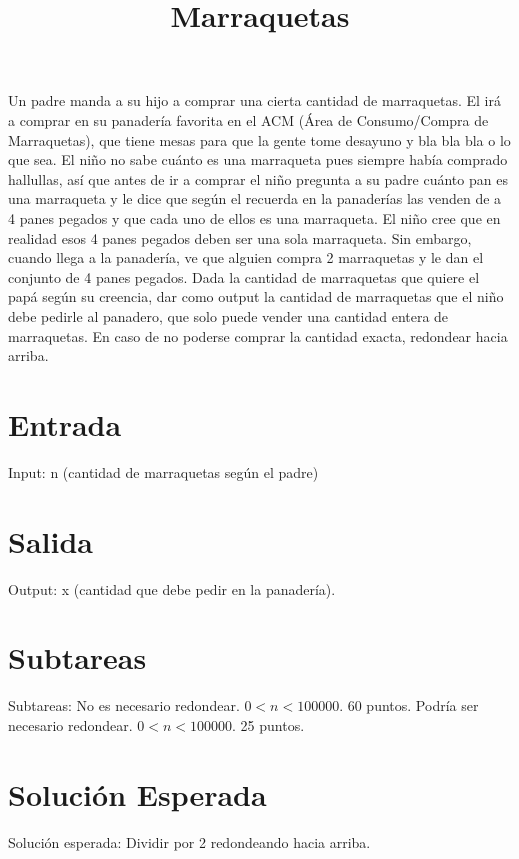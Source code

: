 \documentclass{article}
\title{Marraquetas}
\begin{document}
\maketitle

Un padre manda a su hijo a comprar una cierta cantidad de marraquetas. El irá a comprar en su panadería favorita en el ACM (Área de Consumo/Compra de Marraquetas), que tiene mesas para que la gente tome desayuno y bla bla bla o lo que sea. El niño no sabe cuánto es una marraqueta pues siempre había comprado hallullas, así que antes de ir a comprar el niño pregunta a su padre cuánto pan es una marraqueta y le dice que según el recuerda en la panaderías las venden de a 4 panes pegados y que cada uno de ellos es una marraqueta. El niño cree que en realidad esos 4 panes pegados deben ser una sola marraqueta. Sin embargo, cuando llega a la panadería, ve que alguien compra 2 marraquetas y le dan el conjunto de 4 panes pegados. Dada la cantidad de marraquetas que quiere el papá según su creencia, dar como output la cantidad de marraquetas que el niño debe pedirle al panadero, que solo puede vender una cantidad entera de marraquetas.
En caso de no poderse comprar la cantidad exacta, redondear hacia arriba.

\section*{Entrada}
Input: n (cantidad de marraquetas según el padre)

\section*{Salida}
Output: x (cantidad que debe pedir en la panadería).


\section*{Subtareas}
Subtareas:
No es necesario redondear. $0 < n < 100000$. 60 puntos.
Podría ser necesario redondear. $0 < n < 100000$. 25 puntos.


\section*{Solución Esperada}
Solución esperada: Dividir por 2 redondeando hacia arriba.


 
\end{document}
